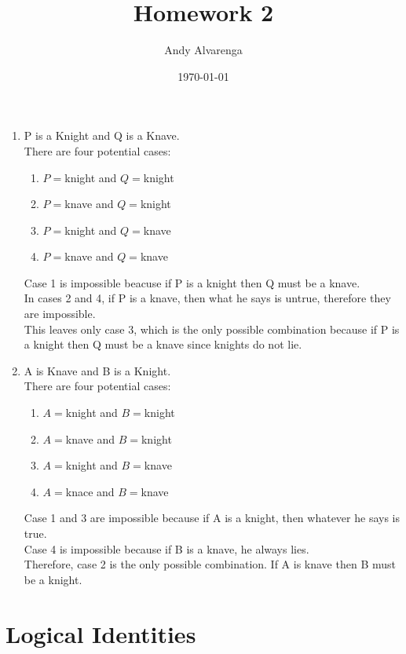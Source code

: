 \documentclass[11pt]{article}
\title{Homework 2}
\author{Andy Alvarenga}
\date{\today}
\begin{document}
\maketitle

\begin{enumerate}
\item
P is a Knight and Q is a Knave.\\
There are four potential cases:\\
\begin{enumerate}
\item $P = $knight and $Q = $knight
\item $P = $knave and $Q = $knight
\item $P = $knight and $Q = $knave
\item $P = $knave and $Q = $knave
\end{enumerate}
Case 1 is impossible beacuse if P is a knight then Q must be a knave.\\
In cases 2 and 4, if P is a knave, then what he says is untrue, therefore they are impossible.\\
This leaves only case 3, which is the only possible combination because if P is a knight then Q must be a knave since knights do not lie.\\

\item
A is Knave and B is a Knight.\\
There are four potential cases:\\
\begin{enumerate}
\item $A = $knight and $B = $knight
\item $A = $knave and $B = $knight
\item $A = $knight and $B = $knave
\item $A = $knace and $B = $knave
\end{enumerate}
Case 1 and 3 are impossible because if A is a knight, then whatever he says is true.\\
Case 4 is impossible because if B is a knave, he always lies.\\
Therefore, case 2 is the only possible combination. If A is knave then B must be a knight.\\
\end{enumerate}

\section{Logical Identities} 
\end{document}
